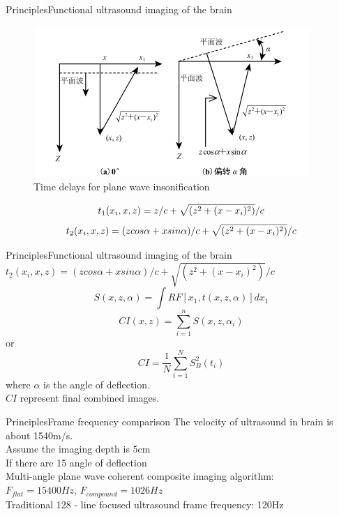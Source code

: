 \documentclass{beamer}
\begin{document}
\begin{frame}{Principles}{Functional ultrasound imaging of the brain}
\begin{figure}
	\centering
	\includegraphics[width=0.8\linewidth]{principle1}
	\caption{Time delays for plane wave insonification}
	\label{fig:principle1}
\end{figure}
\begin{equation}
\small
t_{1}(x_{i},x,z) = z/c + \sqrt{(z^{2}+(x-x_{i})^{2})}/c
\end{equation}
\begin{equation}
\small
t_{2}(x_{i},x,z) = (zcos\alpha+xsin\alpha)/c + \sqrt{(z^{2}+(x-x_{i})^{2})}/c
\end{equation}

\end{frame}

\begin{frame}{Principles}{Functional ultrasound imaging of the brain}
\centering
\small
$t_{2}(x_{i},x,z) = (zcos\alpha+xsin\alpha)/c + \sqrt{(z^{2}+(x-x_{i})^{2})}/c$
\vspace{0.2cm}
\begin{equation}
S(x,z,\alpha) = \displaystyle{\int RF[x_{1},t(x,z,\alpha)] dx_{1} }
\end{equation}
\begin{equation}
CI(x,z) = \sum_{i=1}^nS(x,z,\alpha_{i})
\end{equation}or
\begin{equation}
CI = \frac{1}{N}\sum_{i=1}^NS_{B}^{2}(t_{i})
\end{equation}
where $\alpha$ is the angle of deflection.\\ $CI$ represent final combined images.
\end{frame}
\begin{frame}{Principles}{Frame frequency comparison}
	The velocity of ultrasound in brain is about 1540m/s.
	\\
	Assume the imaging depth is 5cm\\
	If there are 15 angle of deflection\\
	\vspace{0.7cm}
	\small
	Multi-angle plane wave coherent composite imaging algorithm:\\
	$F_{flat} = 15400Hz$, \alert{$F_{compound} = 1026Hz$}
	\vspace{0.5cm}
	\\
	Traditional 128 - line focused ultrasound frame frequency: \alert{120Hz}
	
\end{frame}
\end{document}
